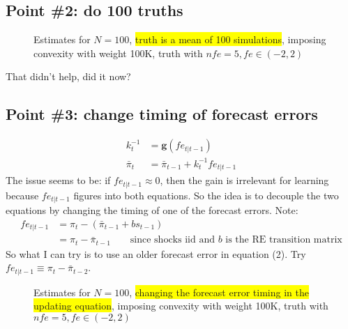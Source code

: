 \documentclass[11pt]{article}
\def \myFigPath {../../figures/}
\renewcommand{\[}{\begin{equation}}
\renewcommand{\]}{\end{equation}}
\def\mySmallerFigScale{0.18}
\def\myTinyFigScale{0.16}
\begin{document}
\subsection*{Point \#2: do 100 truths}
\begin{figure}[h!]
\hfill
{}
\caption{Estimates for $N=100$, \colorbox{yellow}{truth is a mean of 100 simulations}, imposing convexity with weight 100K, truth with $nfe=5, fe \in(-2,2)$}
\end{figure}
That didn't help, did it now?

\newpage 
\subsection*{Point \#3:  change timing of forecast errors}
\begin{align}
k_t^{-1} &= \mathbf{g}(fe_{t|t-1}) \label{gaineq}\\
\bar{\pi}_t &= \bar{\pi}_{t-1} + k_t^{-1}fe_{t|t-1} \label{pibeq}
\end{align}
The issue 	seems to be: if $fe_{t|t-1} \approx 0$, then the gain is irrelevant for learning because $fe_{t|t-1}$ figures into both equations. So the idea is to decouple the two equations by changing the timing of one of the forecast errors. Note:
\begin{align}
fe_{t|t-1} &= \pi_t - (\bar{\pi}_{t-1}+bs_{t-1})\\
&= \pi_t - \bar{\pi}_{t-1} \quad \quad \text{since shocks iid and $b$ is the RE transition matrix}
\end{align}
So what I can try is to use an older forecast error in equation (2). Try $fe_{t|t-1}\equiv \pi_t - \bar{\pi}_{t-2}$.
\begin{figure}[h!]
\hfill
{}
\caption{Estimates for $N=100$, \colorbox{yellow}{changing the forecast error timing in the updating equation}, imposing convexity with weight 100K, truth with $nfe=5, fe \in(-2,2)$}
\end{figure}
\end{document}
